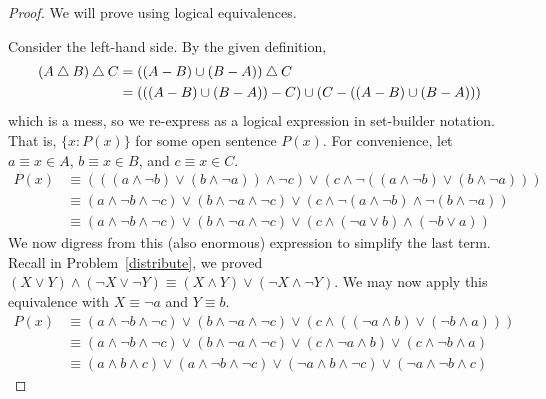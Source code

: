 \documentclass{agony}
\begin{document}
\begin{proof}
  We will prove using logical equivalences.

  Consider the left-hand side. By the given definition,
  \begin{align*}
    (A \mathbin{\triangle} B) \mathbin{\triangle} C & = ((A-B) \cup (B-A)) \mathbin{\triangle} C                              \\
                      & = (((A-B) \cup (B-A)) - C) \cup (C - ((A-B) \cup (B-A)))
  \end{align*}
  which is a mess, so we re-express as a logical expression in set-builder notation.
  That is, $\{ x : P(x) \}$ for some open sentence $P(x)$.
  For convenience, let $a \equiv x\in A$, $b \equiv x\in B$, and $c \equiv x\in C$.
  \begin{align*}
    P(x)
     & \equiv (((a \land \lnot b) \lor (b \land \lnot a)) \land \lnot c)
    \lor (c \land \lnot((a \land \lnot b) \lor (b \land \lnot a)))                 \\
     & \equiv (a \land \lnot b \land \lnot c) \lor (b \land \lnot a \land \lnot c)
    \lor (c \land \lnot(a \land \lnot b) \land \lnot(b \land \lnot a))             \\
     & \equiv (a \land \lnot b \land \lnot c) \lor (b \land \lnot a \land \lnot c)
    \lor (c \land (\lnot a \lor b) \land (\lnot b \lor a))
  \end{align*}
  We now digress from this (also enormous) expression to simplify the last term.
  Recall in Problem~\ref{distribute}, we proved
  $(X \lor Y) \land (\lnot X \lor \lnot Y) \equiv (X \land Y) \lor (\lnot X \land \lnot Y)$.
  We may now apply this equivalence with $X\equiv\lnot a$ and $Y\equiv b$.
  \begin{align*}
    P(x)
     & \equiv (a \land \lnot b \land \lnot c) \lor (b \land \lnot a \land \lnot c)
    \lor (c \land ((\lnot a \land b) \lor (\lnot b \land a)))                      \\
     & \equiv (a \land \lnot b \land \lnot c) \lor (b \land \lnot a \land \lnot c)
    \lor (c \land \lnot a \land b) \lor (c \land \lnot b \land a)                  \\
     & \equiv (a \land b \land c) \lor (a \land \lnot b \land \lnot c)
    \lor (\lnot a \land b \land \lnot c) \lor (\lnot a \land \lnot b \land c)
  \end{align*}


\end{proof}
\end{document}
